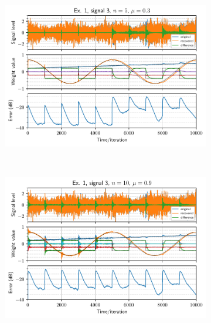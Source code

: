 \begin{figure}[h]
\begin{subfigure}[t]{0.30\columnwidth}
        \caption{}
    \end{subfigure} \hfill
    \begin{subfigure}[t]{0.30\columnwidth}
        \centering
        \includegraphics[width=\columnwidth]{figures/pdf/ex1_l3_n5_mu30.pdf}
        \caption{}
    \end{subfigure} \\
    \begin{subfigure}[t]{0.30\columnwidth}
        \centering
        \includegraphics[width=\columnwidth]{figures/pdf/ex1_l3_n10_mu90.pdf}
        \caption{}
    \end{subfigure} \hfill
    \begin{subfigure}[t]{0.30\columnwidth}
        \centering

\end{subfigure}
\end{figure}
